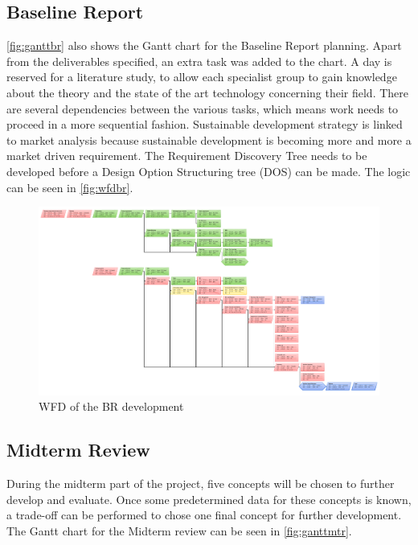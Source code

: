 \documentclass[a4paper]{report}
\begin{document}
\subsection{Baseline Report}
\autoref{fig:ganttbr} also shows the Gantt chart for the Baseline Report planning. Apart from the deliverables specified, an extra task was added to the chart. A day is reserved for a literature study, to allow each specialist group to gain knowledge about the theory and the state of the art technology concerning their field. \newline
\noindent
There are several dependencies between the various tasks, which means work needs to proceed in a more sequential fashion. Sustainable development strategy is linked to market analysis because sustainable development is becoming more and more a market driven requirement. The Requirement Discovery Tree needs to be  developed before a Design Option Structuring tree (DOS) can be made. The logic can be seen in \autoref{fig:wfdbr}.
\begin{figure}[H]
	\centering
	
	\includegraphics[width=\textheight, angle=270]{Figures/BASEWFD.pdf}
	\caption{WFD of the BR development}
	\label{fig:wfdbr}
	
\end{figure}
\subsection{Midterm Review}
During the midterm part of the project, five concepts will be chosen to further develop and evaluate. Once some predetermined data for these concepts is known, a trade-off can be performed to chose one final concept for further development. The Gantt chart for the Midterm review can be seen in \autoref{fig:ganttmtr}. 
\end{document}
